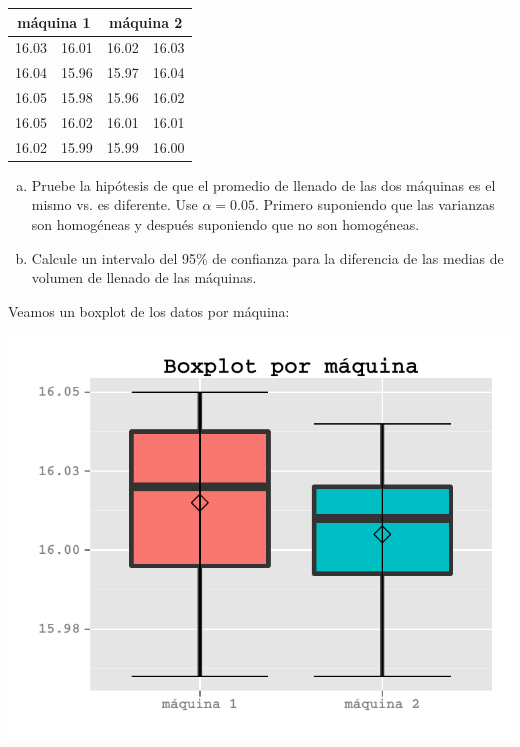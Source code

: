 \documentclass[a4paper]{scrartcl}\usepackage[]{graphicx}\usepackage[]{color}
\makeatletter
\def\maxwidth{ %
  \ifdim\Gin@nat@width>\linewidth
    \linewidth
  \else
    \Gin@nat@width
  \fi
}
\newenvironment{knitrout}{}{} %
\makeatother
\begin{document}
\begin{table}[h!]
\centering
\begin{tabular}[t]{|c|c|c|c|}
\hline
\multicolumn{2}{|c|}{\textbf{máquina 1}}&\multicolumn{2}{|c|}{\textbf{máquina 2}}\\
\hline
16.03&16.01&16.02&16.03\\
16.04&15.96&15.97&16.04\\
16.05&15.98&15.96&16.02\\
16.05&16.02&16.01&16.01\\
16.02&15.99&15.99&16.00\\
\hline
\end{tabular}
\end{table}

\begin{enumerate}[a)]
  \item Pruebe la hipótesis de que el promedio de llenado de las dos máquinas es el mismo vs. es diferente.  Use $\alpha=0.05$. Primero suponiendo que las varianzas son homogéneas y después suponiendo que no son homogéneas.
  \item Calcule un intervalo del 95\% de confianza para la diferencia de las  medias de volumen de llenado de las máquinas.
\end{enumerate}

\noindent Veamos un boxplot de los datos por máquina:

\begin{knitrout}
\color{fgcolor}

{\centering \includegraphics[width=\maxwidth]{figure/unnamed-chunk-4} 

}



\end{knitrout}
\end{document}
